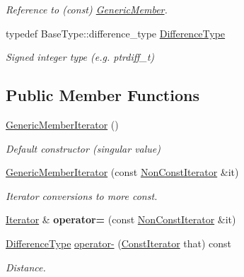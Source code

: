 \begin{DoxyCompactItemize}
\begin{DoxyCompactList}\small\item\em Reference to (const) \hyperlink{a00117}{Generic\+Member}. \end{DoxyCompactList}\item 
typedef Base\+Type\+::difference\+\_\+type \hyperlink{a00118_a902b99c8ae351cd7626514dc5f30740a}{Difference\+Type}\hypertarget{a00118_a902b99c8ae351cd7626514dc5f30740a}{}\label{a00118_a902b99c8ae351cd7626514dc5f30740a}

\begin{DoxyCompactList}\small\item\em Signed integer type (e.\+g. {\ttfamily ptrdiff\+\_\+t}) \end{DoxyCompactList}\end{DoxyCompactItemize}
\subsection*{Public Member Functions}
\begin{DoxyCompactItemize}
\item 
\hyperlink{a00118_a2708717d497a0aadacdf75900de4c5b4}{Generic\+Member\+Iterator} ()
\begin{DoxyCompactList}\small\item\em Default constructor (singular value) \end{DoxyCompactList}\item 
\hyperlink{a00118_a2697fd327a90654b0bf91c988e43f95e}{Generic\+Member\+Iterator} (const \hyperlink{a00118_abc26eb06f2962765b11dcd06ce84ac02}{Non\+Const\+Iterator} \&it)
\begin{DoxyCompactList}\small\item\em Iterator conversions to more const. \end{DoxyCompactList}\item 
\hyperlink{a00118_ad1cf1ecf6210b47906c9f179c893a8b8}{Iterator} \& {\bfseries operator=} (const \hyperlink{a00118_abc26eb06f2962765b11dcd06ce84ac02}{Non\+Const\+Iterator} \&it)\hypertarget{a00118_a4ebb2b80e7d70c11802520ae77958df3}{}\label{a00118_a4ebb2b80e7d70c11802520ae77958df3}

\item 
\hyperlink{a00118_a902b99c8ae351cd7626514dc5f30740a}{Difference\+Type} \hyperlink{a00118_a056851821e75c4be13b297604bc37c0b}{operator-\/} (\hyperlink{a00118_ae5be27a73dce0be58ee2776db896d591}{Const\+Iterator} that) const \hypertarget{a00118_a056851821e75c4be13b297604bc37c0b}{}\label{a00118_a056851821e75c4be13b297604bc37c0b}

\begin{DoxyCompactList}\small\item\em Distance. \end{DoxyCompactList}\end{DoxyCompactItemize}
